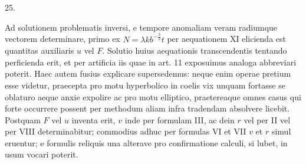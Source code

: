 \begin{center}
\hypertarget{native-042-article025}{}25.
\end{center}
Ad solutionem problematis inversi, e tempore anomaliam veram radiumque vectorem determinare, primo ex $N=\lambda kb^{-\frac{3}{2}}t$ per aequationem XI elicienda est quantitas auxiliaris $u$ vel $F$. Solutio huius aequationis transcendentis tentando perficienda erit, et per artificia iis quae in art. 11 exposuimus analoga abbreviari poterit. Haec autem fusius explicare supersedemus: neque enim operae pretium esse videtur, praecepta pro motu hyperbolico in coelis vix unquam fortasse se oblaturo aeque anxie expolire ac pro motu elliptico, praetereaque omnes casus qui forte occurrere possent per methodum aliam infra tradendam absolvere licebit. Postquam $F$ vel $u$ inventa erit, $v$ inde per formulam III, ac dein $r$ vel per II vel per VIII determinabitur; commodius adhuc per formulas VI et VII $v$ et $r$ simul eruentur; e formulis reliquis una alterave pro confirmatione calculi, si lubet, in usum vocari poterit.

